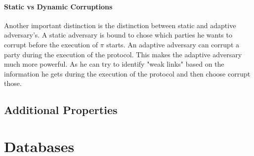 \paragraph{Static vs Dynamic Corruptions}
Another important distinction is the distinction between static and adaptive adversary's. A static adversary is bound to chose which parties he wants to corrupt before the execution of $ \pi $ starts. An adaptive adversary can corrupt a party during the execution of the protocol. This makes the adaptive adversary much more powerful. As he can try to identify "weak links" based on the information he gets during the execution of the protocol and then choose corrupt those.   



\subsection{Additional Properties}

\section{Databases}
